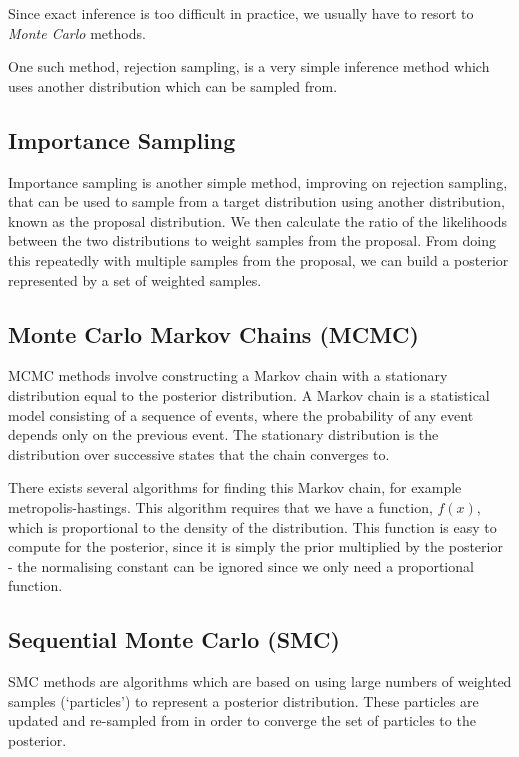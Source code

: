Since exact inference is too difficult in practice, we usually have to resort to \textit{Monte Carlo} \cite{monte-carlo} methods.

One such method, rejection sampling, is a very simple inference method which uses another distribution which can be sampled from.

\subsection{Importance Sampling}

Importance sampling is another simple method, improving on rejection sampling, that can be used to sample from a target distribution using another distribution, known as the proposal distribution. We then calculate the ratio of the likelihoods between the two distributions to weight samples from the proposal. From doing this repeatedly with multiple samples from the proposal, we can build a posterior represented by a set of weighted samples.


\subsection{Monte Carlo Markov Chains (MCMC)}

MCMC methods involve constructing a Markov chain with a stationary distribution equal to the posterior distribution. A Markov chain is a statistical model consisting of a sequence of events, where the probability of any event depends only on the previous event. The stationary distribution is the distribution over successive states that the chain converges to.

There exists several algorithms for finding this Markov chain, for example metropolis-hastings. This algorithm requires that we have a function, $f(x)$, which is proportional to the density of the distribution. This function is easy to compute for the posterior, since it is simply the prior multiplied by the posterior - the normalising constant can be ignored since we only need a proportional function.

\subsection{Sequential Monte Carlo (SMC)}

SMC methods are algorithms which are based on using large numbers of weighted samples (`particles') to represent a posterior distribution. These particles are updated and re-sampled from in order to converge the set of particles to the posterior.

